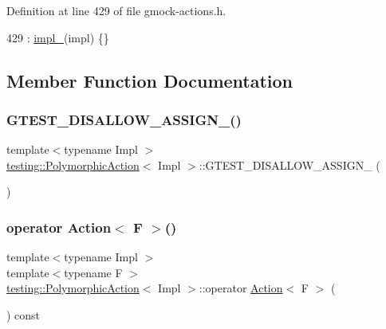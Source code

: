 Definition at line 429 of file gmock-\/actions.\+h.


\begin{DoxyCode}
429 : \hyperlink{classtesting_1_1PolymorphicAction_ac072ea4c539fd1c6be75798fe9d801f4}{impl\_}(impl) \{\}
\end{DoxyCode}


\subsection{Member Function Documentation}
\mbox{\label{classtesting_1_1PolymorphicAction_a12db33e1d2f389637961994c851c97b6}} 
\subsubsection{\texorpdfstring{G\+T\+E\+S\+T\+\_\+\+D\+I\+S\+A\+L\+L\+O\+W\+\_\+\+A\+S\+S\+I\+G\+N\+\_\+()}{GTEST\_DISALLOW\_ASSIGN\_()}}
{\footnotesize\ttfamily template$<$typename Impl $>$ \\
\hyperlink{classtesting_1_1PolymorphicAction}{testing\+::\+Polymorphic\+Action}$<$ Impl $>$\+::G\+T\+E\+S\+T\+\_\+\+D\+I\+S\+A\+L\+L\+O\+W\+\_\+\+A\+S\+S\+I\+G\+N\+\_\+ (\begin{DoxyParamCaption}\item[{\hyperlink{classtesting_1_1PolymorphicAction}{Polymorphic\+Action}$<$ Impl $>$}]{ }\end{DoxyParamCaption})\hspace{0.3cm}{\ttfamily [private]}}

\mbox{\label{classtesting_1_1PolymorphicAction_ac35461616cc15c06f1a2f9ee1c03fb8f}} 
\subsubsection{\texorpdfstring{operator Action$<$ F $>$()}{operator Action< F >()}}
{\footnotesize\ttfamily template$<$typename Impl $>$ \\
template$<$typename F $>$ \\
\hyperlink{classtesting_1_1PolymorphicAction}{testing\+::\+Polymorphic\+Action}$<$ Impl $>$\+::operator \hyperlink{classtesting_1_1Action}{Action}$<$ F $>$ (\begin{DoxyParamCaption}{ }\end{DoxyParamCaption}) const\hspace{0.3cm}{\ttfamily [inline]}}



